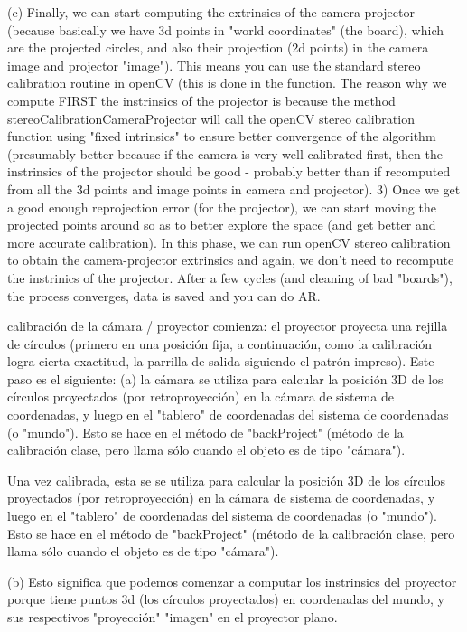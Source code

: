(c) Finally, we can start computing the extrinsics of the camera-projector (because basically we have 3d points in "world coordinates" (the board), which are the projected circles, and also their projection (2d points) in the camera image and projector "image"). This means you can use the standard stereo calibration routine in openCV (this is done in the function. The reason why we compute FIRST the instrinsics of the projector is because the method stereoCalibrationCameraProjector will call the openCV stereo calibration function using "fixed intrinsics" to ensure better convergence of the algorithm (presumably better because if the camera is very well calibrated first, then the instrinsics of the projector should be good - probably better than if recomputed from all the 3d points and image points in camera and projector). 
3) Once we get a good enough reprojection error (for the projector), we can start moving the projected points around so as to better explore the space (and get better and more accurate calibration). In this phase, we can run openCV stereo calibration to obtain the camera-projector extrinsics and again, we don't need to recompute the instrinics of the projector. After a few cycles (and cleaning of bad "boards"), the process converges, data is saved and you can do AR. 


calibración de la cámara / proyector comienza: el proyector proyecta una rejilla de círculos (primero en una posición fija, a continuación, como la calibración logra cierta exactitud, la parrilla de salida siguiendo el patrón impreso). Este paso es el siguiente: (a) la cámara se utiliza para calcular la posición 3D de los círculos proyectados (por retroproyección) en la cámara de sistema de coordenadas, y luego en el "tablero" de coordenadas del sistema de coordenadas (o "mundo"). Esto se hace en el método de "backProject" (método de la calibración clase, pero llama sólo cuando el objeto es de tipo "cámara"). 

Una vez calibrada, esta se se utiliza para calcular la posición 3D de los círculos proyectados (por retroproyección) en la cámara de sistema de coordenadas, y luego en el "tablero" de coordenadas del sistema de coordenadas (o "mundo"). Esto se hace en el método de "backProject" (método de la calibración clase, pero llama sólo cuando el objeto es de tipo "cámara"). 

(b) Esto significa que podemos comenzar a computar los instrinsics del proyector porque tiene puntos 3d (los círculos proyectados) en coordenadas del mundo, y sus respectivos "proyección" "imagen" en el proyector plano. 


